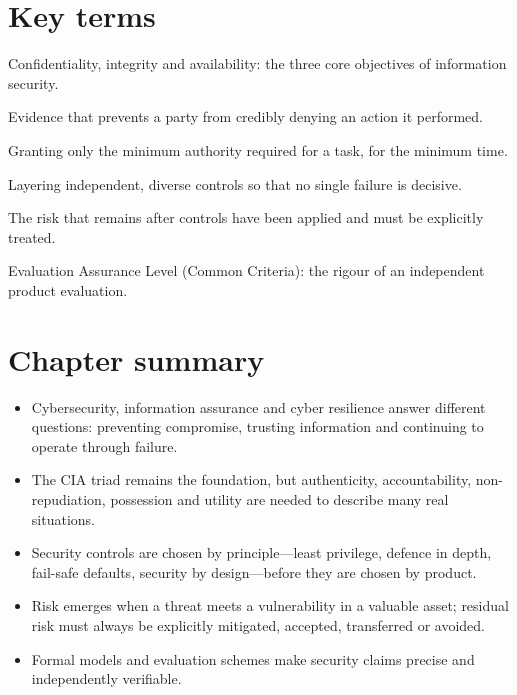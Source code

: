 \section*{Key terms}
\begin{description}[style=nextline,leftmargin=1.2em]
  \item[CIA triad] Confidentiality, integrity and availability: the three core objectives of information security.
  \item[Non-repudiation] Evidence that prevents a party from credibly denying an action it performed.
  \item[Least privilege] Granting only the minimum authority required for a task, for the minimum time.
  \item[Defence in depth] Layering independent, diverse controls so that no single failure is decisive.
  \item[Residual risk] The risk that remains after controls have been applied and must be explicitly treated.
  \item[EAL] Evaluation Assurance Level (Common Criteria): the rigour of an independent product evaluation.
\end{description}

\section*{Chapter summary}
\begin{itemize}
  \item Cybersecurity, information assurance and cyber resilience answer different questions: preventing compromise, trusting information and continuing to operate through failure.
  \item The CIA triad remains the foundation, but authenticity, accountability, non-repudiation, possession and utility are needed to describe many real situations.
  \item Security controls are chosen by principle—least privilege, defence in depth, fail-safe defaults, security by design—before they are chosen by product.
  \item Risk emerges when a threat meets a vulnerability in a valuable asset; residual risk must always be explicitly mitigated, accepted, transferred or avoided.
  \item Formal models and evaluation schemes make security claims precise and independently verifiable.
\end{itemize}


